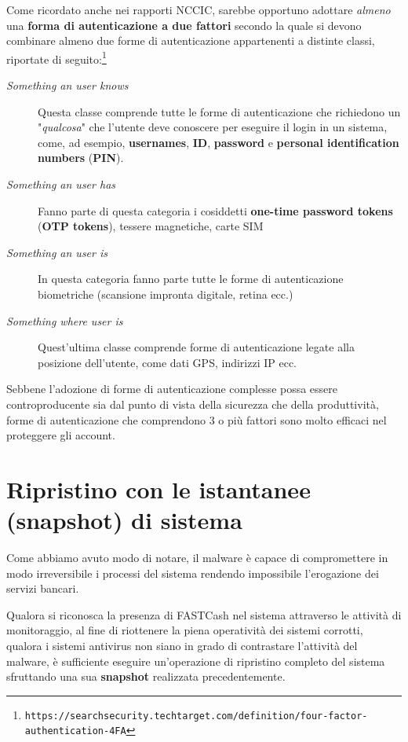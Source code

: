 \documentclass[10pt,a4paper, titlepage]{report}
\begin{document}
Come ricordato anche nei rapporti NCCIC, sarebbe opportuno adottare \textit{almeno} una \textbf{forma di autenticazione a due fattori} secondo la quale si devono combinare almeno due forme di autenticazione appartenenti a distinte classi, riportate di seguito:\footnote{\texttt{https://searchsecurity.techtarget.com/definition/four-factor-authentication-4FA}}
\begin{description}
\item[\textit{Something an user knows}] Questa classe comprende tutte le forme di autenticazione che richiedono un "\textit{qualcosa}" che l'utente deve conoscere per eseguire il login in un sistema, come, ad esempio, \textbf{usernames}, \textbf{ID}, \textbf{password} e \textbf{personal identification numbers} (\textbf{PIN}).
\item[\textit{Something an user has}] Fanno parte di questa categoria i cosiddetti \textbf{one-time password tokens} (\textbf{OTP tokens}), tessere magnetiche, carte SIM
\item[\textit{Something an user is}] In questa categoria fanno parte tutte le forme di autenticazione biometriche (scansione impronta digitale, retina ecc.)
\item[\textit{Something where user is}] Quest'ultima classe comprende forme di autenticazione legate alla posizione dell'utente, come dati  GPS, indirizzi IP ecc.
\end{description} 

Sebbene l'adozione di forme di autenticazione complesse possa essere controproducente sia dal punto di vista della sicurezza che della produttività, forme di autenticazione che comprendono 3 o più fattori sono molto efficaci nel proteggere gli account.

\section{Ripristino con le istantanee (snapshot) di sistema}

Come abbiamo avuto modo di notare, il malware è capace di compromettere in modo irreversibile i processi del sistema rendendo impossibile l'erogazione dei servizi bancari.

Qualora si riconosca la presenza di FASTCash nel sistema attraverso le attività di monitoraggio, al fine di riottenere la piena operatività dei sistemi corrotti, qualora i sistemi antivirus non siano in grado di contrastare l'attività del malware, è sufficiente eseguire un'operazione di ripristino completo del sistema sfruttando una sua \textbf{snapshot} realizzata precedentemente. 
\end{document}
